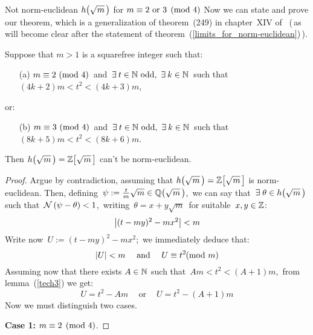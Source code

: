 \begin{subsection}{Not norm-euclidean $\hh{m}$ for %
                   $m \equiv 2 \text{ or } 3 \pmod 4$}
%
Now we can state and prove our theorem, which is a generalization of
theorem~(249) in chapter~XIV of~\cite{H&W} (\,as will become clear
after the statement of theorem~(\ref{limits_for_norm-euclidean})\,).

\begin{thm}\label{BIG}
Suppose that $m > 1$ is a squarefree integer such that:
\begin{itemize}
%
\item[{\rm\textsf{(a)\:}}]
$m \equiv 2\ \mathrm{(mod\ 4)}$\, and\,
$\exists\: t \in \mathbb{N}\ \textrm{odd},\ \exists\: k \in \mathbb{N}$\,
such that\, $(4k + 2)m < t^2 < (4k + 3)m$,
%
\end{itemize}
or:
\begin{itemize}
%
\item[{\rm\textsf{(b)\:}}]
$m \equiv 3\ \mathrm{(mod\ 4)}$\, and\,
$\exists\: t \in \mathbb{N}\ \textrm{odd},\ \exists\: k \in \mathbb{N}$\,
such that\, $(8k + 5)m < t^2 < (8k + 6)m$.
%
\end{itemize}
%
Then $\hh{m} = \ZZ{m}$ can't be norm-euclidean.
\end{thm}

\begin{proof}
%
Argue by contradiction, assuming that $\hh{m} = \ZZ{m}$ is
norm-euclidean. Then, defining\,
\mbox{$\psi:=\frac{t}{m}\sqrt{m} \in \QQ{m}$,\,}
we can say that\, $\exists\; \theta \in
\hh{m}$\, such that\, $\mathcal{N}\left(\psi - \theta\right) < 1$,\, \ie
writing\, $\theta = x + y\sqrt{m}$\, for suitable\,
$x, y \in \mathbb{Z}$:
%
\begin{equation*}
\left| (t - my)^2 - mx^2 \right| < m
\end{equation*}
%
Write now\, $U:= (t - my)^2 - mx^2$;\, we immediately
deduce that:
\begin{equation*}
\left|U\right| < m \quad\ \text{and} \quad\ U \equiv
t^2 \!\!\!\pmod m
\end{equation*}
Assuming now that there exists $A \in \mathbb{N}$ such that\,
$Am < t^2 < (A + 1)m$,\, from lemma~(\ref{tech3}) we get:
\begin{equation}\label{BIGeq}
U = t^2 - Am \quad\ \text{or} \quad\ U = t^2 - (A + 1)m
\end{equation}
Now we must distinguish two cases.

\medskip
\textbf{Case 1\::}\: $m \equiv 2 \pmod 4$.


\end{proof}
\end{subsection}
